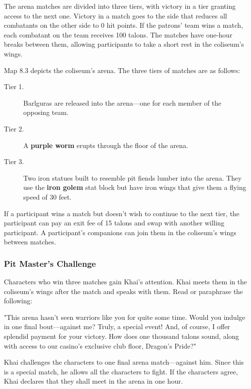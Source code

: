 \documentclass[10pt,a4paper,twoside,bg=print,twocolumn,openany,nodeprecatedcode]{dndbook}
\begin{document}
The arena matches are divided into three tiers, with victory in a tier granting access to the next one. Victory in a match goes to the side that reduces all combatants on the other side to 0 hit points. If the patrons' team wins a match, each combatant on the team receives 100 talons. The matches have one-hour breaks between them, allowing participants to take a short rest in the coliseum's wings.

Map 8.3 depicts the coliseum's arena. The three tiers of matches are as follows:


\begin{description}
\item[Tier 1.]
Barlguras are released into the arena—one for each member of the opposing team.
\item[Tier 2.]
A \textbf{purple worm} erupts through the floor of the arena.
\item[Tier 3.]
Two iron statues built to resemble pit fiends lumber into the arena. They use the \textbf{iron golem} stat block but have iron wings that give them a flying speed of 30 feet.
\end{description}

If a participant wins a match but doesn't wish to continue to the next tier, the participant can pay an exit fee of 15 talons and swap with another willing participant. A participant's companions can join them in the coliseum's wings between matches.

\subsubsection{Pit Master's Challenge}
Characters who win three matches gain Khai's attention. Khai meets them in the coliseum's wings after the match and speaks with them. Read or paraphrase the following:

\begin{DndReadAloud}{}
"This arena hasn't seen warriors like you for quite some time. Would you indulge in one final bout—against me? Truly, a special event! And, of course, I offer splendid payment for your victory. How does one thousand talons sound, along with access to our casino's exclusive club floor, Dragon's Pride?"

\end{DndReadAloud}

Khai challenges the characters to one final arena match—against him. Since this is a special match, he allows all the characters to fight. If the characters agree, Khai declares that they shall meet in the arena in one hour.
\end{document}
